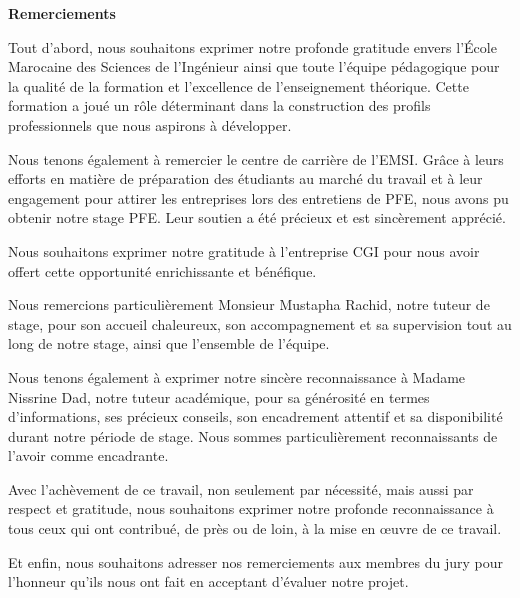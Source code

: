 \documentclass[a4paper,15pt]{report}
\begin{document}
	

	
\cleardoublepage
\thispagestyle{empty}
\begin{center}
	\vspace*{2cm}
	{\Large \textbf{Remerciements}}
\end{center}

\vspace{1cm}
	\label{sec:rem}
	Tout d'abord, nous souhaitons exprimer notre profonde gratitude envers l'École Marocaine des Sciences de l'Ingénieur ainsi que toute l'équipe pédagogique pour la qualité de la formation et l'excellence de l'enseignement théorique. Cette formation a joué un rôle déterminant dans la construction des profils professionnels que nous aspirons à développer.
	
	\vspace{0.3cm}
	Nous tenons également à remercier le centre de carrière de l'EMSI. Grâce à leurs efforts en matière de préparation des étudiants au marché du travail et à leur engagement pour attirer les entreprises lors des entretiens de PFE, nous avons pu obtenir notre stage PFE. Leur soutien a été précieux et est sincèrement apprécié.
	
	\vspace{0.3cm}
	Nous souhaitons exprimer notre gratitude à l'entreprise CGI pour nous avoir offert cette opportunité enrichissante et bénéfique.
	
	\vspace{0.3cm}
	Nous remercions particulièrement Monsieur Mustapha Rachid, notre tuteur de stage, pour son accueil chaleureux, son accompagnement et sa supervision tout au long de notre stage, ainsi que l'ensemble de l'équipe.
	
	\vspace{0.3cm}
	Nous tenons également à exprimer notre sincère reconnaissance à Madame Nissrine Dad, notre tuteur académique, pour sa générosité en termes d'informations, ses précieux conseils, son encadrement attentif et sa disponibilité durant notre période de stage. Nous sommes particulièrement reconnaissants de l'avoir comme encadrante.
	
	\vspace{0.3cm}
	Avec l'achèvement de ce travail, non seulement par nécessité, mais aussi par respect et gratitude, nous souhaitons exprimer notre profonde reconnaissance à tous ceux qui ont contribué, de près ou de loin, à la mise en œuvre de ce travail.
	
	\vspace{0.3cm}
	Et enfin, nous souhaitons adresser nos remerciements aux membres du jury pour l'honneur qu'ils nous ont fait en acceptant d'évaluer notre projet.
\end{document}
